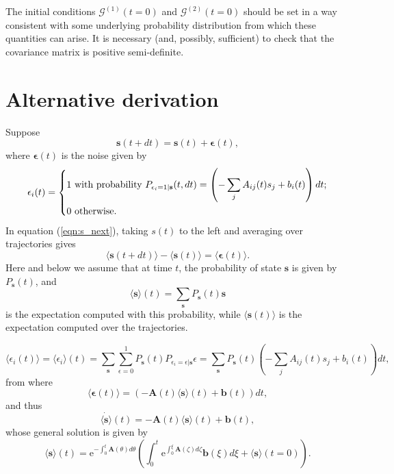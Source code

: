 \documentclass[a4paper, 11pt]{article}
\begin{document}
The initial conditions $\boldsymbol{\mathcal G}^{(1)}(t=0)$ and $\boldsymbol{\mathcal G}^{(2)}(t=0)$ should be set in a way consistent with some underlying probability distribution from which these quantities can arise. It is necessary (and, possibly, sufficient) to check that the covariance matrix is positive semi-definite.

\section{Alternative derivation}
Suppose
\begin{equation}\label{eqn:s_next}
  \mathbf s(t+dt) = \mathbf s(t) + \boldsymbol\epsilon(t),
\end{equation}
where $\boldsymbol\epsilon(t)$ is the noise given by
\begin{equation*}
  \epsilon_i(t) = 
  \begin{dcases}
    1 \text{ with probability } P_{\epsilon_i=1 | \mathbf s}(t, dt) = \left(-\sum_{j}A_{ij}(t)s_j+b_i(t)\right)dt;\\
    0 \text{ otherwise}.
  \end{dcases}
\end{equation*}
In equation (\ref{eqn:s_next}), taking $s(t)$ to the left and averaging over trajectories gives
\begin{equation}\label{eqn:expectations_over_trajectories}
  \langle\mathbf s(t+dt)\rangle - \langle\mathbf s(t)\rangle = \langle\boldsymbol\epsilon(t)\rangle.
\end{equation}
Here and below we assume that at time $t$, the probability of state $\mathbf s$ is given by $P_{\mathbf s}(t)$, and
\begin{equation}
  \langle \mathbf s\rangle(t) = \sum_{\mathbf s}P_{\mathbf s}(t)\mathbf s
\end{equation}
is the expectation computed with this probability, while $\langle \mathbf s(t)\rangle$ is the expectation computed over the trajectories.

\begin{equation}
  \langle\epsilon_i(t)\rangle =   \langle\epsilon_i\rangle(t) = \sum_{\mathbf s}\sum_{\epsilon=0}^1P_{\mathbf s}(t)P_{\epsilon_i=\epsilon|\mathbf s}\epsilon = \sum_{\mathbf s}P_{\mathbf s}(t)\left(-\sum_{j}A_{ij}(t)s_j+b_i(t)\right)dt,
\end{equation}
from where
\begin{equation}
  \langle\boldsymbol \epsilon(t)\rangle = \left(-\mathbf A(t)\langle \mathbf s\rangle(t) + \mathbf b(t)\right)dt,
\end{equation}
and thus
\begin{equation}\label{eqn:o1_ODE_}
  \dot{\langle\mathbf s\rangle}(t) = -\mathbf A(t)\langle \mathbf s\rangle(t) + \mathbf b(t),
\end{equation}
whose general solution is given by
\begin{equation}\label{eqn:general_solution_for_expectations}
  \langle\mathbf s\rangle(t) = \mathrm e^{-\int_0^t\mathbf A(\theta)d\theta}\left(\int_0^t\mathrm e^{\int_0^\xi\mathbf A(\zeta)d\zeta}\mathbf b(\xi)d\xi + \langle\mathbf s\rangle(t=0)\right).
\end{equation}
\end{document}
